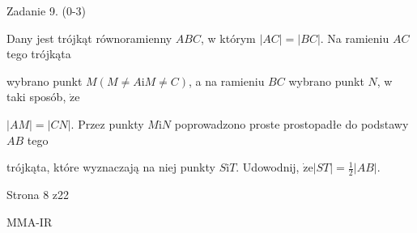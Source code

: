 \documentclass[a4paper,12pt]{article}
\begin{document}
Zadanie 9. (0-3)

Dany jest trójkąt równoramienny $ABC$, w którym $|AC|=|BC|$. Na ramieniu $AC$ tego trójkąta

wybrano punkt $M(M\neq A\mathrm{i}M\neq C)$, a na ramieniu $BC$ wybrano punkt $N$, w taki sposób, $\dot{\mathrm{z}}\mathrm{e}$

$|AM|=|CN|$. Przez punkty $M\mathrm{i}N$ poprowadzono proste prostopadłe do podstawy $AB$ tego

trójkąta, które wyznaczają na niej punkty $S\mathrm{i}T$. Udowodnij, $\displaystyle \dot{\mathrm{z}}\mathrm{e}|ST|=\frac{1}{2}|AB|.$

Strona 8 z22

MMA-IR
\end{document}
